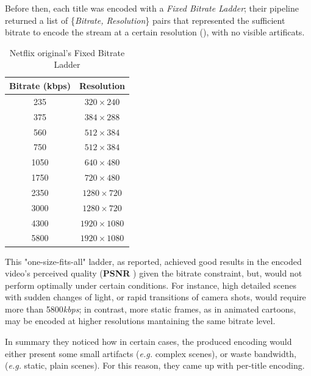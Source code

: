 Before then, each title was encoded with a \emph{Fixed Bitrate Ladder}; their
pipeline returned a list of \{\emph{Bitrate, Resolution}\} pairs that
represented the sufficient bitrate to encode the stream at a certain
resolution (), with no visible artificats.

\begin{table}[htb]
  \centering
  \begin{tabular}{|c|c|}
    \hline
    \textbf{Bitrate (kbps)} & \textbf{Resolution} \\
    \hline
    235                     &    $320\times240$ \\
    \hline
    375                     &    $384\times288$ \\
    \hline
    560                     &    $512\times384$ \\
    \hline
    750                     &    $512\times384$ \\
    \hline
    1050                    &    $640\times480$ \\
    \hline
    1750                    &    $720\times480$ \\
    \hline
    2350                    &   $1280\times720$ \\
    \hline
    3000                    &   $1280\times720$ \\
    \hline
    4300                    &   $1920\times1080$ \\
    \hline
    5800                    &   $1920\times1080$ \\
    \hline
  \end{tabular}
  \caption{Netflix original's Fixed Bitrate Ladder}
  \label{tab:fixed-ladder}
\end{table}

This "one-size-fits-all" ladder, as reported, achieved good results in the
encoded video's perceived quality (\textbf{PSNR} \cite{psnr}) given the bitrate
constraint, but, would not perform optimally under certain conditions. For
instance, high detailed scenes with sudden changes of light, or rapid
transitions of camera shots, would require more than 5800\emph{kbps}; in
contrast, more static frames, as in animated cartoons, may be encoded at higher
resolutions mantaining the same bitrate level.

In summary they noticed how in certain cases, the produced encoding would
either present some small artifacts (\emph{e.g.} complex scenes), or waste
bandwidth, (\emph{e.g.} static, plain scenes). For this reason, they came up
with per-title encoding.

